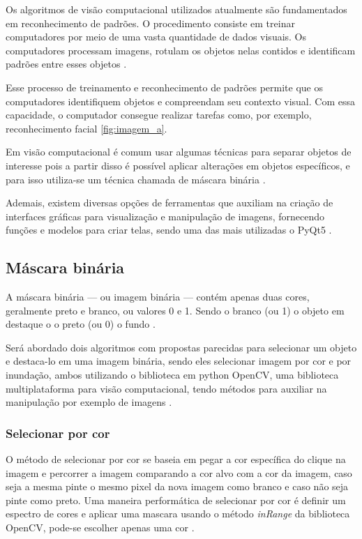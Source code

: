 Os algoritmos de visão computacional utilizados atualmente são fundamentados em reconhecimento de padrões. O procedimento consiste em treinar computadores por meio de uma vasta quantidade de dados visuais. Os computadores processam imagens, rotulam os objetos nelas contidos e identificam padrões entre esses objetos \space\cite{content_Human_Vision}.

Esse processo de treinamento e reconhecimento de padrões permite que os computadores identifiquem objetos e compreendam seu contexto visual. Com essa capacidade, o computador consegue realizar tarefas como, por exemplo, reconhecimento facial \cref{fig:imagem_a}.

Em visão computacional é comum usar algumas técnicas para separar objetos de interesse pois a partir disso é possível aplicar alterações em objetos específicos, e para isso utiliza-se um técnica chamada de máscara binária \cite{NVIDIA,Embarcados}.

Ademais, existem diversas opções de ferramentas que auxiliam na criação de interfaces gráficas para visualização e manipulação de imagens, fornecendo funções e modelos para criar telas, sendo uma das mais utilizadas o PyQt5 \cite{uniteai2023}.

\subsection{Máscara binária}
\label{subsec:mascara_binaria}

A máscara binária — ou imagem binária — contém apenas duas cores, geralmente preto e branco, ou valores 0 e 1. Sendo o branco (ou 1) o objeto em destaque o o preto (ou 0) o fundo \cite{Embarcados}.

Será abordado dois algoritmos com propostas parecidas para selecionar um objeto e destaca-lo em uma imagem binária, sendo eles selecionar imagem por cor e por inundação, ambos utilizando o biblioteca em python OpenCV, uma biblioteca multiplataforma para visão computacional, tendo métodos para auxiliar na manipulação por exemplo de imagens \cite{OpenCV}.

\subsubsection{Selecionar por cor}
\label{subsubsec:sel_cor}

O método de selecionar por cor se baseia em pegar a cor específica do clique na imagem e percorrer a imagem comparando a cor alvo com a cor da imagem, caso seja a mesma pinte o mesmo pixel da nova imagem como branco e caso não seja pinte como preto. Uma maneira performática de selecionar por cor é definir um espectro de cores e aplicar uma mascara usando o método \textit{inRange} da biblioteca OpenCV, pode-se escolher apenas uma cor \cite{OpenCVInRange}.

